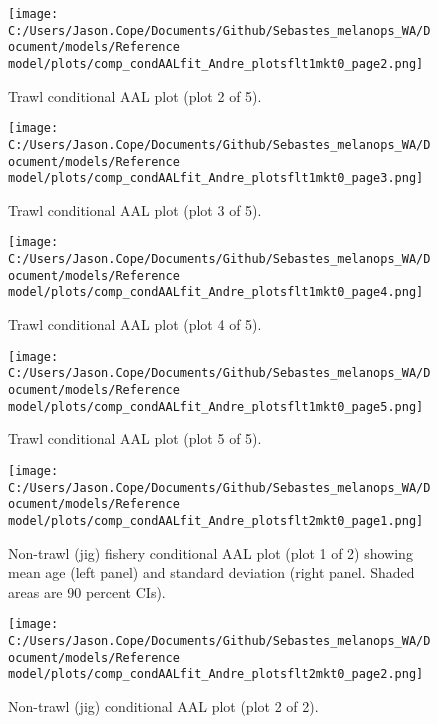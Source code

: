 \documentclass[11pt,
  english,
  letterpaper,
]{article}
\begin{document}
\begin{figure}
\centering
\texttt{[image: C:/Users/Jason.Cope/Documents/Github/Sebastes\_melanops\_WA/Document/models/Reference model/plots/comp\_condAALfit\_Andre\_plotsflt1mkt0\_page2.png]}
\caption{Trawl conditional AAL plot (plot 2 of 5).\label{fig:comp_condAALfit_Andre_plotsflt1mkt0_page2}}
\end{figure}

\begin{figure}
\centering
\texttt{[image: C:/Users/Jason.Cope/Documents/Github/Sebastes\_melanops\_WA/Document/models/Reference model/plots/comp\_condAALfit\_Andre\_plotsflt1mkt0\_page3.png]}
\caption{Trawl conditional AAL plot (plot 3 of 5).\label{fig:comp_condAALfit_Andre_plotsflt1mkt0_page3}}
\end{figure}

\begin{figure}
\centering
\texttt{[image: C:/Users/Jason.Cope/Documents/Github/Sebastes\_melanops\_WA/Document/models/Reference model/plots/comp\_condAALfit\_Andre\_plotsflt1mkt0\_page4.png]}
\caption{Trawl conditional AAL plot (plot 4 of 5).\label{fig:comp_condAALfit_Andre_plotsflt1mkt0_page4}}
\end{figure}

\begin{figure}
\centering
\texttt{[image: C:/Users/Jason.Cope/Documents/Github/Sebastes\_melanops\_WA/Document/models/Reference model/plots/comp\_condAALfit\_Andre\_plotsflt1mkt0\_page5.png]}
\caption{Trawl conditional AAL plot (plot 5 of 5).\label{fig:comp_condAALfit_Andre_plotsflt1mkt0_page5}}
\end{figure}

\begin{figure}
\centering
\texttt{[image: C:/Users/Jason.Cope/Documents/Github/Sebastes\_melanops\_WA/Document/models/Reference model/plots/comp\_condAALfit\_Andre\_plotsflt2mkt0\_page1.png]}
\caption{Non-trawl (jig) fishery conditional AAL plot (plot 1 of 2) showing mean age (left panel) and standard deviation (right panel. Shaded areas are 90 percent CIs).\label{fig:comp_condAALfit_Andre_plotsflt2mkt0_page1}}
\end{figure}

\begin{figure}
\centering
\texttt{[image: C:/Users/Jason.Cope/Documents/Github/Sebastes\_melanops\_WA/Document/models/Reference model/plots/comp\_condAALfit\_Andre\_plotsflt2mkt0\_page2.png]}
\caption{Non-trawl (jig) conditional AAL plot (plot 2 of 2).\label{fig:comp_condAALfit_Andre_plotsflt2mkt0_page2}}
\end{figure}
\end{document}

